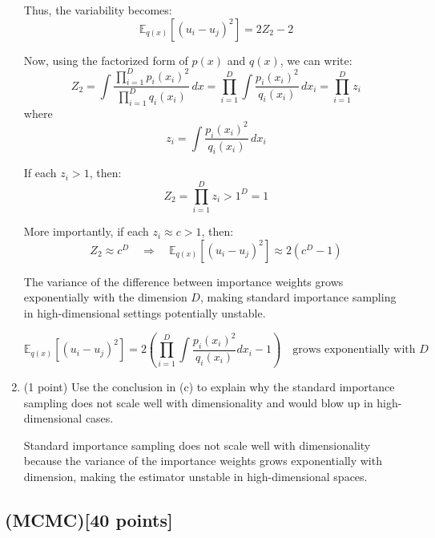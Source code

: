 \documentclass{article}
\begin{document}
\begin{enumerate}
Thus, the variability becomes:
\[
\mathbb{E}_{q(x)}[(u_i - u_j)^2] = 2Z_2 - 2
\]

Now, using the factorized form of \( p(x) \) and \( q(x) \), we can write:
\[
Z_2 = \int \frac{\prod_{i=1}^D p_i(x_i)^2}{\prod_{i=1}^D q_i(x_i)} \, dx = \prod_{i=1}^D \int \frac{p_i(x_i)^2}{q_i(x_i)} \, dx_i = \prod_{i=1}^D z_i
\]
where
\[
z_i = \int \frac{p_i(x_i)^2}{q_i(x_i)} \, dx_i
\]

If each \( z_i > 1 \), then:
\[
Z_2 = \prod_{i=1}^D z_i > 1^D = 1
\]

More importantly, if each \( z_i \approx c > 1 \), then:
\[
Z_2 \approx c^D \quad \Rightarrow \quad \mathbb{E}_{q(x)}[(u_i - u_j)^2] \approx 2(c^D - 1)
\]

\noindent
The variance of the difference between importance weights grows exponentially with the dimension \( D \), making standard importance sampling in high-dimensional settings potentially unstable.

\[
\boxed{
\mathbb{E}_{q(x)}[(u_i - u_j)^2] = 2 \left( \prod_{i=1}^D \int \frac{p_i(x_i)^2}{q_i(x_i)} dx_i - 1 \right) \quad \text{grows exponentially with } D
}
\]


\item (1 point) Use the conclusion in (c) to explain why the standard importance sampling does not scale well
with dimensionality and would blow up in high-dimensional cases.

Standard importance sampling does not scale well with dimensionality because the variance of the importance weights grows exponentially with dimension, making the estimator unstable in high-dimensional spaces.

\end{enumerate}

\subsection{(MCMC)[40 points]}
\end{document}
